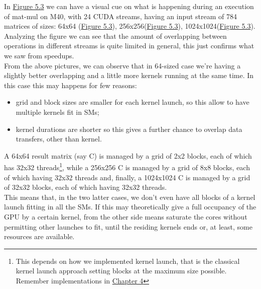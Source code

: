 In \hyperref[fig:timeln]{Figure 5.3} we can have a visual cue on what is happening during an execution of mat-mul on M40, with 24 CUDA streams, having an input stream of 784 matrices of sizes: 64x64 (\hyperref[fig:timeln64]{Figure 5.3}), 256x256(\hyperref[fig:timeln256]{Figure 5.3}), 1024x1024(\hyperref[fig:timeln1024]{Figure 5.3}).\\
Analyzing the figure we can see that the amount of overlapping between operations in different streams is quite limited in general, this just confirms what we saw from speedups.\\
From the above pictures, we can observe that in 64-sized case we're having a slightly better overlapping and a little more kernels running at the same time. In this case this may happens for few reasons:
\begin{itemize}
	\item grid and block sizes are smaller for each kernel launch, so this allow to have multiple kernels fit in SMs;
	\item kernel durations are shorter so this gives a further chance to overlap data transfers, other than kernel.
\end{itemize} 

A 64x64 result matrix (say C) is managed by a grid of 2x2 blocks, each of which has 32x32 threads\footnote{This depends on how we implemented kernel launch, that is the classical kernel launch approach setting blocks at the maximum size possible. Remember implementations in \hyperref[chap:impl]{Chapter 4}}, while a 256x256 C is managed by a grid of 8x8 blocks, each of which having 32x32 threads and, finally, a 1024x1024 C is managed by a grid of 32x32 blocks, each of which having 32x32 threads.\\
This means that, in the two latter cases, we don't even have all blocks of a kernel launch fitting in all the SMs. If this may theoretically give a full occupancy of the GPU by a certain kernel, from the other side means saturate the cores without permitting other launches to fit, until the residing kernels ends or, at least, some resources are available.

